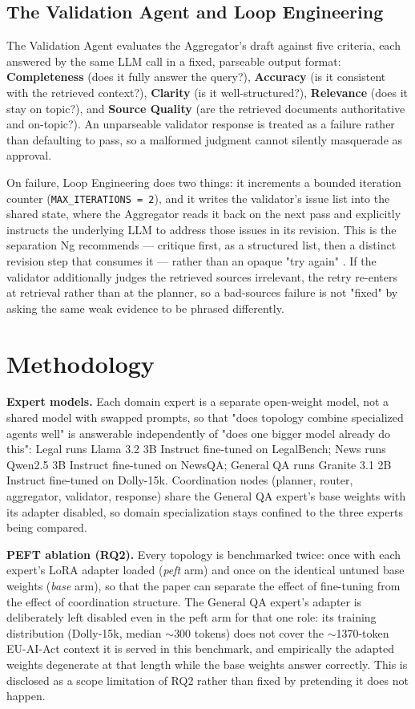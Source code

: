 \documentclass[journal,10pt,compsoc,onecolumn]{IEEEtran}
\begin{document}
\subsection{The Validation Agent and Loop Engineering}
The Validation Agent evaluates the Aggregator's draft against five criteria, each answered by the same LLM call in a fixed, parseable output format: \textbf{Completeness} (does it fully answer the query?), \textbf{Accuracy} (is it consistent with the retrieved context?), \textbf{Clarity} (is it well-structured?), \textbf{Relevance} (does it stay on topic?), and \textbf{Source Quality} (are the retrieved documents authoritative and on-topic?). An unparseable validator response is treated as a failure rather than defaulting to pass, so a malformed judgment cannot silently masquerade as approval.

On failure, Loop Engineering does two things: it increments a bounded iteration counter (\texttt{MAX\_ITERATIONS = 2}), and it writes the validator's issue list into the shared state, where the Aggregator reads it back on the next pass and explicitly instructs the underlying LLM to address those issues in its revision. This is the separation Ng recommends --- critique first, as a structured list, then a distinct revision step that consumes it --- rather than an opaque "try again" \cite{ng_playbook_2026}. If the validator additionally judges the retrieved sources irrelevant, the retry re-enters at retrieval rather than at the planner, so a bad-sources failure is not "fixed" by asking the same weak evidence to be phrased differently.

\section{Methodology}
\textbf{Expert models.} Each domain expert is a separate open-weight model, not a shared model with swapped prompts, so that "does topology combine specialized agents well" is answerable independently of "does one bigger model already do this": Legal runs Llama 3.2 3B Instruct fine-tuned on LegalBench; News runs Qwen2.5 3B Instruct fine-tuned on NewsQA; General QA runs Granite 3.1 2B Instruct fine-tuned on Dolly-15k. Coordination nodes (planner, router, aggregator, validator, response) share the General QA expert's base weights with its adapter disabled, so domain specialization stays confined to the three experts being compared.

\textbf{PEFT ablation (RQ2).} Every topology is benchmarked twice: once with each expert's LoRA adapter loaded (\emph{peft} arm) and once on the identical untuned base weights (\emph{base} arm), so that the paper can separate the effect of fine-tuning from the effect of coordination structure. The General QA expert's adapter is deliberately left disabled even in the peft arm for that one role: its training distribution (Dolly-15k, median $\sim$300 tokens) does not cover the $\sim$1370-token EU-AI-Act context it is served in this benchmark, and empirically the adapted weights degenerate at that length while the base weights answer correctly. This is disclosed as a scope limitation of RQ2 rather than fixed by pretending it does not happen.
\end{document}
